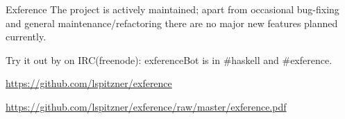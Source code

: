 \begin{hcarentry}{Exference}
The project is actively maintained; apart from occasional bug-fixing and
general maintenance/refactoring there are no major new features planned
currently.

Try it out by on IRC(freenode): exferenceBot is in \#haskell and \#exference.

\FurtherReading
{\small
\begin{compactitem}
  \item
    \url{https://github.com/lspitzner/exference}
  \item
    \url{https://github.com/lspitzner/exference/raw/master/exference.pdf}
\end{compactitem}
}
\end{hcarentry}
